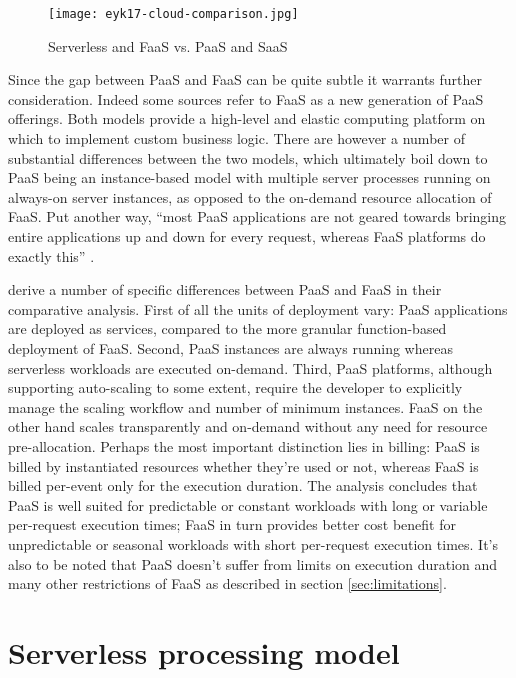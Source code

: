 \begin{figure}[h]
  \centering
  \texttt{[image: eyk17-cloud-comparison.jpg]}
  \caption{Serverless and FaaS vs. PaaS and SaaS \parencite{van2017spec}}
  \label{fig:cloudSpectrum}
\end{figure}

Since the gap between PaaS and FaaS can be quite subtle it warrants further consideration. Indeed some sources \parencite[e.g.][]{adzic2017serverless} refer to FaaS as a new generation of PaaS offerings. Both models provide a high-level and elastic computing platform on which to implement custom business logic. There are however a number of substantial differences between the two models, which ultimately boil down to PaaS being an instance-based model with multiple server processes running on always-on server instances, as opposed to the on-demand resource allocation of FaaS. Put another way, ``most PaaS applications are not geared towards bringing entire applications up and down for every request, whereas FaaS platforms do exactly this'' \parencite{robert2016serverlessarchitectures}.

\textcite{albuquerque17faaspaas} derive a number of specific differences between PaaS and FaaS in their comparative analysis. First of all the units of deployment vary: PaaS applications are deployed as services, compared to the more granular function-based deployment of FaaS. Second, PaaS instances are always running whereas serverless workloads are executed on-demand. Third, PaaS platforms, although supporting auto-scaling to some extent, require the developer to explicitly manage the scaling workflow and number of minimum instances. FaaS on the other hand scales transparently and on-demand without any need for resource pre-allocation. Perhaps the most important distinction lies in billing: PaaS is billed by instantiated resources whether they're used or not, whereas FaaS is billed per-event only for the execution duration. The analysis concludes that PaaS is well suited for predictable or constant workloads with long or variable per-request execution times; FaaS in turn provides better cost benefit for unpredictable or seasonal workloads with short per-request execution times. It's also to be noted that PaaS doesn't suffer from limits on execution duration and many other restrictions of FaaS as described in section \ref{sec:limitations}.

\section{Serverless processing model} \label{sec:processingModel}


